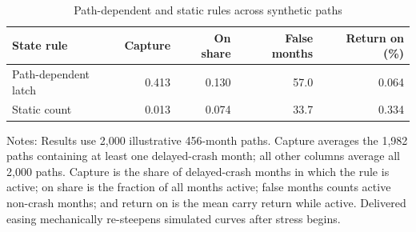 \begin{table}[!htbp]
\centering
\caption{Path-dependent and static rules across synthetic paths}
\label{tab:synthetic_latch}
\small
\begin{tabular}{lrrrr}
\toprule
State rule & Capture & On share & False months & Return on (\%) \\
\midrule
Path-dependent latch & 0.413 & 0.130 & 57.0 & 0.064 \\
Static count & 0.013 & 0.074 & 33.7 & 0.334 \\
\bottomrule
\end{tabular}
\begin{minipage}{0.93\linewidth}\footnotesize Notes: Results use 2,000 illustrative 456-month paths. Capture averages the 1,982 paths containing at least one delayed-crash month; all other columns average all 2,000 paths. Capture is the share of delayed-crash months in which the rule is active; on share is the fraction of all months active; false months counts active non-crash months; and return on is the mean carry return while active. Delivered easing mechanically re-steepens simulated curves after stress begins.\end{minipage}
\end{table}
